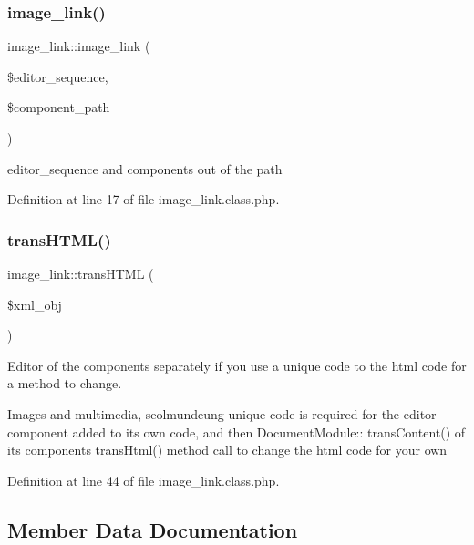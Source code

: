 \mbox{\label{classimage__link_a572a8311c1aaa3ddfbe3c1d027822fab}} 
\subsubsection{\texorpdfstring{image\+\_\+link()}{image\_link()}}
{\footnotesize\ttfamily image\+\_\+link\+::image\+\_\+link (\begin{DoxyParamCaption}\item[{}]{\$editor\+\_\+sequence,  }\item[{}]{\$component\+\_\+path }\end{DoxyParamCaption})}



editor\+\_\+sequence and components out of the path 



Definition at line 17 of file image\+\_\+link.\+class.\+php.

\mbox{\label{classimage__link_ac26727c59ca0972802129f4a7b1060cb}} 
\subsubsection{\texorpdfstring{trans\+H\+T\+M\+L()}{transHTML()}}
{\footnotesize\ttfamily image\+\_\+link\+::trans\+H\+T\+ML (\begin{DoxyParamCaption}\item[{}]{\$xml\+\_\+obj }\end{DoxyParamCaption})}



Editor of the components separately if you use a unique code to the html code for a method to change. 

Images and multimedia, seolmundeung unique code is required for the editor component added to its own code, and then Document\+Module\+:\+: trans\+Content() of its components trans\+Html() method call to change the html code for your own 

Definition at line 44 of file image\+\_\+link.\+class.\+php.



\subsection{Member Data Documentation}
\mbox{\label{classimage__link_ae68f572cbf4ce0aaa8ac20dd6b98a2f0}} 
